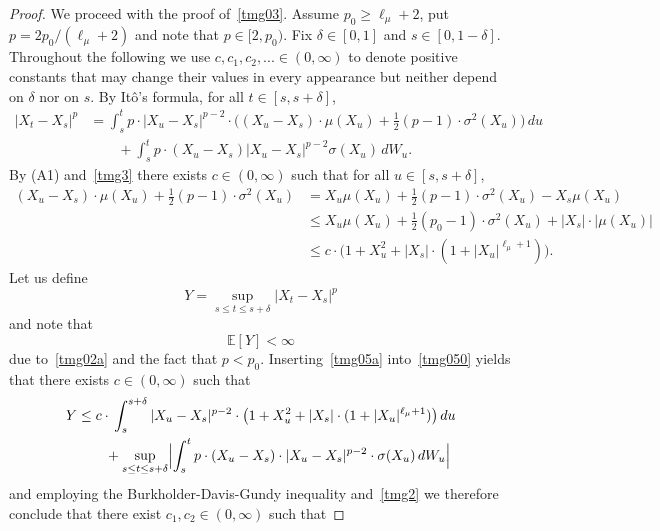 \documentclass[11pt]{amsart}
\newcommand{\EE}{{\mathbb E}}
\theoremstyle{plain}
\theoremstyle{definition}
\begin{document}
\begin{proof}
We proceed with the proof of~\eqref{tmg03}.  Assume $p_0\ge \ell_\mu+2$, put $p=2p_0/(\ell_\mu+2)$ and note that $p\in[2,p_0)$. Fix $\delta\in [0,1]$ and $s\in[0,1-\delta]$.
 Throughout the following we use $c,c_1,c_2,...\in(0,\infty)$ to denote positive constants that may change their values in every appearance but neither depend on $\delta$ nor on $s$. By It\^{o}'s formula,  for all
$t\in [s,s+\delta]$,
\begin{equation}\label{tmg050}
\begin{aligned}
|X_t-X_s|^{p} & = \int_s^t p\cdot |X_u-X_s|^{p-2}\cdot \bigl( (X_u-X_s)\cdot \mu(X_u) + \frac{1}{2}  (p-1) \cdot \sigma^2(X_u)\bigr)\, du \\
& \qquad +  \int_s^t p \cdot (X_u-X_s)|X_u-X_s|^{p-2}\sigma(X_u)\, dW_u.
\end{aligned}
\end{equation}
By (A1) and~\eqref{tmg3} there exists $c\in (0,\infty)$ such that for all $u\in[s,s+\delta]$,
\begin{equation}\label{tmg05a}
\begin{aligned}
(X_u-X_s)\cdot \mu(X_u) + \frac{1}{2}  (p-1) \cdot\sigma^2(X_u) & =
 X_u\mu(X_u) + \frac{1}{2}  (p-1)\cdot \sigma^2(X_u) - X_s\mu(X_u)\\
& \le  X_u\mu(X_u) + \frac{1}{2}  (p_0-1)\cdot \sigma^2(X_u) + |X_s|\cdot |\mu(X_u)| \\
&  \le c\cdot \bigl( 1+X_u^2 + |X_s|\cdot (1 + |X_u|^{\ell_\mu+1})\bigr).
\end{aligned}
\end{equation}
Let us define
\[
Y = \sup_{s\le t\le s+\delta} |X_t-X_s|^p
\]
and note that
\begin{equation}\label{tmg05c}
\EE[Y] <\infty
\end{equation}
due to~\eqref{tmg02a} and the fact that $p<p_0$.
 Inserting~\eqref{tmg05a} into~\eqref{tmg050} yields that there exists $c\in (0,\infty)$ such that
\begin{equation}\label{tmg05b}
\begin{aligned}
Y & \le  c\cdot \,\int_s^{s+\delta} |X_u-X_s|^{p-2}\cdot  \bigl( 1+X_u^2 + |X_s|\cdot(1 + |X_u|^{\ell_\mu+1})\bigr)\, du \\
& \qquad +  \sup_{s\le t\le s+\delta}\Bigl|\int_s^t p \cdot (X_u-X_s)\cdot |X_u-X_s|^{p-2}\cdot \sigma(X_u)\, dW_u\Bigr|
\end{aligned}
\end{equation}
and employing the Burkholder-Davis-Gundy inequality and~\eqref{tmg2} we therefore conclude that there exist $c_1, c_2\in (0,\infty)$ such that

\end{proof}
\end{document}
